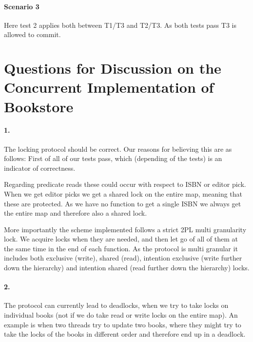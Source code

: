 \documentclass[a4paper, 11pt]{article}
\begin{document}

\paragraph{Scenario 3} %
\label{par:scenario_3}

Here test 2 applies both between T1/T3 and T2/T3. As both tests pass T3 is allowed to commit.



\pagebreak
\section{Questions for Discussion on the Concurrent Implementation of Bookstore} %
\label{sec:questions_for_discussion_on_the_concurrent_implementation_of_bookstore}

\paragraph{1.} %
\label{par:1_}

The locking protocol should be correct. Our reasons for believing this are as follows: First of all of our tests pass, which (depending of the tests) is an indicator of correctness.

Regarding predicate reads these could occur with respect to ISBN or editor pick. When we get editor picks we get a shared lock on the entire map, meaning that these are protected. As we have no function to get a single ISBN we always get the entire map and therefore also a shared lock.

More importantly the scheme implemented follows a strict 2PL multi granularity lock. We acquire locks when they are needed, and then let go of all of them at the same time in the end of each function. As the protocol is multi granular it includes both exclusive (write), shared (read), intention exclusive (write further down the hierarchy) and intention shared (read further down the hierarchy) locks.


\paragraph{2.} %
\label{par:2_}

The protocol can currently lead to deadlocks, when we try to take locks on individual books (not if we do take read or write locks on the entire map). An example is when two threads try to update two books, where they might try to take the locks of the books in different order and therefore end up in a deadlock.
\end{document}
